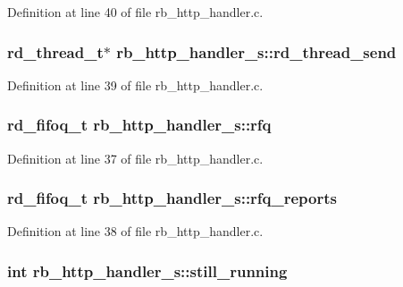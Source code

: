 Definition at line 40 of file rb\-\_\-http\-\_\-handler.\-c.

\hypertarget{structrb__http__handler__s_ab7856bbe03f6e21d3c4663b19d043454}{
\subsubsection[{rd\-\_\-thread\-\_\-send}]{\setlength{\rightskip}{0pt plus 5cm}rd\-\_\-thread\-\_\-t$\ast$ rb\-\_\-http\-\_\-handler\-\_\-s\-::rd\-\_\-thread\-\_\-send}}\label{structrb__http__handler__s_ab7856bbe03f6e21d3c4663b19d043454}


Definition at line 39 of file rb\-\_\-http\-\_\-handler.\-c.

\hypertarget{structrb__http__handler__s_a39160211aefb64ec052138229da98632}{
\subsubsection[{rfq}]{\setlength{\rightskip}{0pt plus 5cm}rd\-\_\-fifoq\-\_\-t rb\-\_\-http\-\_\-handler\-\_\-s\-::rfq}}\label{structrb__http__handler__s_a39160211aefb64ec052138229da98632}


Definition at line 37 of file rb\-\_\-http\-\_\-handler.\-c.

\hypertarget{structrb__http__handler__s_a383f2047cfcdd9fe49d0deacf770a73c}{
\subsubsection[{rfq\-\_\-reports}]{\setlength{\rightskip}{0pt plus 5cm}rd\-\_\-fifoq\-\_\-t rb\-\_\-http\-\_\-handler\-\_\-s\-::rfq\-\_\-reports}}\label{structrb__http__handler__s_a383f2047cfcdd9fe49d0deacf770a73c}


Definition at line 38 of file rb\-\_\-http\-\_\-handler.\-c.

\hypertarget{structrb__http__handler__s_aa49e97bedda03106912088dad0b75e64}{
\subsubsection[{still\-\_\-running}]{\setlength{\rightskip}{0pt plus 5cm}int rb\-\_\-http\-\_\-handler\-\_\-s\-::still\-\_\-running}}\label{structrb__http__handler__s_aa49e97bedda03106912088dad0b75e64}


